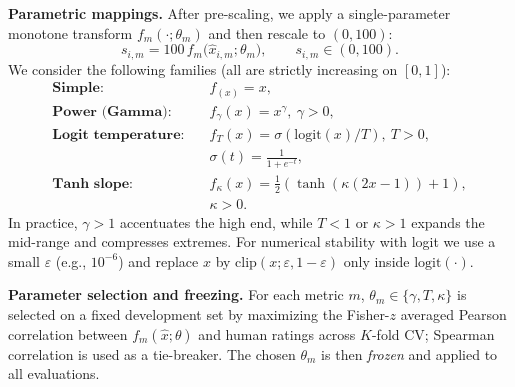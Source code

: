 \textbf{Parametric mappings.}
\label{ssec:mappings}
After pre-scaling, we apply a single-parameter monotone transform $f_m(\cdot;\theta_m)$ and then rescale to $(0,100)$:
\[
s_{i,m}=100\,f_m\!\big(\hat x_{i,m};\theta_m\big),\qquad s_{i,m}\in(0,100).
\]
We consider the following families (all are strictly increasing on $[0,1]$):
\[
\begin{aligned}
\textbf{Simple:} &\quad f_(x) = x,\\[3pt]
\textbf{Power (Gamma):} &\quad f_\gamma(x) = x^\gamma,\ \gamma>0,\\[3pt]
\textbf{Logit temperature:} &\quad
f_T(x) = \sigma(\mathrm{logit}(x)/T),\ T>0,\\
&\quad \sigma(t)=\tfrac{1}{1+e^{-t}},\\[3pt]
\textbf{Tanh slope:} &\quad
f_\kappa(x)=\tfrac12(\tanh(\kappa(2x-1))+1),\\ 
&\quad \kappa>0.
\end{aligned}
\]
In practice, $\gamma>1$ accentuates the high end, while $T<1$ or $\kappa>1$ expands the mid-range and compresses extremes.
For numerical stability with logit we use a small $\varepsilon$ (e.g., $10^{-6}$) and replace $x$ by $\mathrm{clip}(x;\varepsilon,1-\varepsilon)$ only inside $\mathrm{logit}(\cdot)$.

\textbf{Parameter selection and freezing.}
For each metric $m$, $\theta_m\in\{\gamma,T,\kappa\}$ is selected on a fixed development set by maximizing
the Fisher-$z$ averaged Pearson correlation between $f_m(\hat x;\theta)$ and human ratings across $K$-fold CV;
Spearman correlation is used as a tie-breaker. The chosen $\theta_m$ is then \emph{frozen} and applied to all evaluations.

